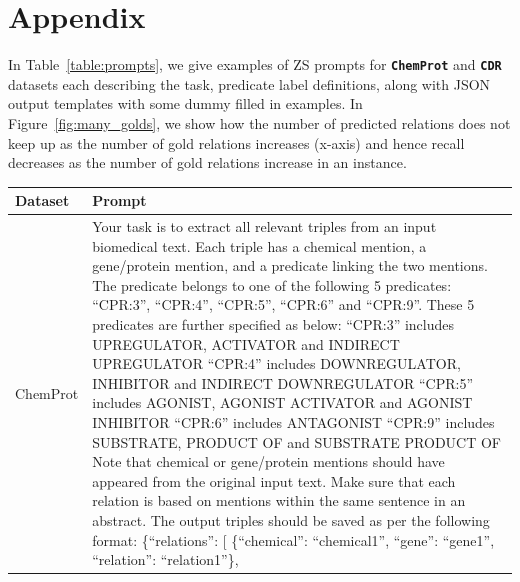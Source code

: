 \documentclass[11pt]{article}
\begin{document}
\section{Appendix}
\label{sec:appendix}
In Table~\ref{table:prompts}, we give examples of ZS prompts for \textbf{\texttt{ChemProt}} and \textbf{\texttt{CDR}} datasets each describing the task, predicate label definitions, along with JSON output templates with some dummy filled in examples.
In Figure~\ref{fig:many_golds}, we show how the number of predicted relations does not keep up as the number of gold relations increases (x-axis) and hence recall decreases as the number of gold relations increase in an instance.
\begin{table}[ht!]
\centering
\tiny
\setlength{\tabcolsep}{1.75pt} 
\begin{tabular}{p{1cm}p{14cm}}
\toprule
\textbf{Dataset} & \textbf{Prompt} \\
\midrule
ChemProt  & Your task is to extract all relevant triples from an input biomedical text. Each triple has a chemical mention, a gene/protein mention, and a predicate linking the two mentions. The predicate belongs to one of the following 5 predicates: ``CPR:3'', ``CPR:4'', ``CPR:5'', ``CPR:6'' and ``CPR:9''. These 5 predicates are further specified as below: \newline
``CPR:3'' includes UPREGULATOR, ACTIVATOR and INDIRECT UPREGULATOR \newline
``CPR:4'' includes DOWNREGULATOR, INHIBITOR and INDIRECT DOWNREGULATOR \newline
``CPR:5'' includes AGONIST, AGONIST ACTIVATOR and AGONIST INHIBITOR \newline
``CPR:6'' includes ANTAGONIST \newline
``CPR:9'' includes SUBSTRATE, PRODUCT OF and SUBSTRATE PRODUCT OF \newline
Note that chemical or gene/protein mentions should have appeared from the original input text. Make sure that each relation is based on mentions within the same sentence in an abstract. \newline
The output triples should be saved as per the following format: \newline
\{``relations'': \newline
[ \newline
  \{``chemical'': ``chemical1'', \newline
    ``gene'': ``gene1'', \newline
    ``relation'': ``relation1''\}, \newline

\end{tabular}
\end{table}
\end{document}
